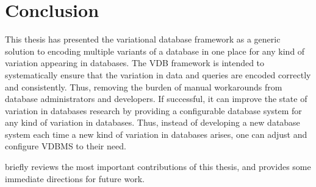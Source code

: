 \chapter{Conclusion}
\label{ch:conclusion}

This thesis has presented the variational database framework as a generic
solution to encoding multiple variants of a database in one place for any 
kind of variation appearing in databases. The VDB framework is intended to
systematically ensure that the variation in data and queries are encoded
correctly and consistently. Thus, removing the burden of manual workarounds
from database administrators and developers. If successful, it can improve 
the state of variation in databases research by providing
a configurable database system for any kind of variation in databases. Thus,
instead of developing a new database system each time a new kind of 
variation in databases arises, one can adjust and configure VDBMS
to their need.

 briefly reviews the most important contributions of this thesis,
and  provides some immediate directions for future work.



